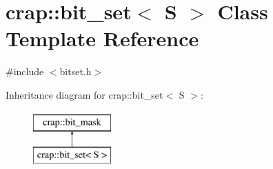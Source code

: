 \hypertarget{classcrap_1_1bit__set}{\section{crap\-:\-:bit\-\_\-set$<$ S $>$ Class Template Reference}
\label{classcrap_1_1bit__set}
}


{\ttfamily \#include $<$bitset.\-h$>$}

Inheritance diagram for crap\-:\-:bit\-\_\-set$<$ S $>$\-:\begin{figure}[H]
\begin{center}
\leavevmode
\includegraphics[height=2.000000cm]{classcrap_1_1bit__set}
\end{center}
\end{figure}
